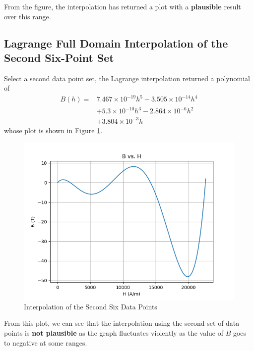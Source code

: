 \documentclass[a4paper,titlepage]{article}
\begin{document}
			From the figure, the interpolation has returned a plot with a \textbf{plausible} result over this range. 
		\subsection{Lagrange Full Domain Interpolation of the Second Six-Point Set}
			Select a second data point set, the Lagrange interpolation returned a polynomial of 
			\begin{align*}
				B(h) = &7.467\times 10^{-19}h^5 - 3.505\times 10^{-14}h^4 \\
					   &+ 5.3\times 10^{-10}h^3 - 2.864\times 10^{-6}h^2 \\
					   &+ 3.804\times 10^{-3}h
			\end{align*}
			whose plot is shown in Figure \ref{bh_second6}. 
			\begin{figure}[!h]
				\centering
				\includegraphics[width=\linewidth]{../data/B_H_second_six}
				\caption{Interpolation of the Second Six Data Points}
				\label{bh_second6}
			\end{figure}
			
			From this plot, we can see that the interpolation using the second set of data points is \textbf{not plausible} as the graph fluctuates violently as the value of $B$ goes to negative at some ranges. 		
		
\end{document}
